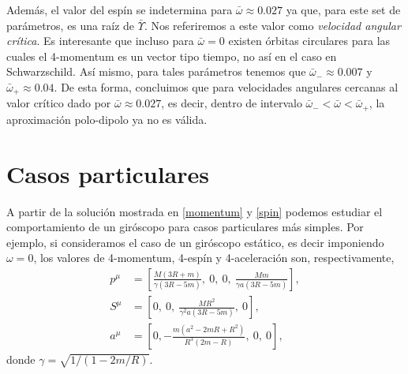 Además, el valor del espín se indetermina para $ \bar{\omega} \approx 0.027 $ ya que, para este set de parámetros, es una raíz de $\bar{\Upsilon}$. Nos referiremos a este valor como \textit{velocidad angular crítica}. Es interesante que incluso para $ \bar{\omega} = 0 $ existen órbitas circulares para las cuales el 4-momentum es un vector tipo tiempo, no así en el caso en Schwarzschild. Así mismo, para tales parámetros tenemos que $\bar{\omega}_- \approx 0.007$ y $\bar{\omega}_+ \approx 0.04$. De esta forma, concluimos que para velocidades angulares cercanas al valor crítico dado por $ \bar{\omega} \approx 0.027 $, es decir, dentro de intervalo $ \bar{\omega}_- < \bar{\omega} < \bar{\omega}_+$, la aproximación polo-dipolo ya no es válida.

\section{Casos particulares}

A partir de la solución mostrada en \eqref{momentum} y \eqref{spin} podemos estudiar el comportamiento de un giróscopo para casos particulares más simples. Por ejemplo, si consideramos el caso de un giróscopo estático, es decir imponiendo $\omega = 0$, los valores de 4-momentum, 4-espín y 4-aceleración son, respectivamente,
\begin{align}
p^{\mu} &= \left[ \frac{M \left(3 R + m\right)}{\gamma \left(3 R - 5 m\right)},\  0,\  0,\  \frac{M m}{\gamma a \left(3 R - 5 m\right)} \right],\\
S^{\mu} &= \left[ 0,\ 0,\ \frac{M R^{2}}{\gamma^{2} a \left(3 R - 5 m\right)},\ 0 \right],\\
a^{\mu} &= \left[ 0, -\frac{m \left(a^{2} - 2 m R + R^{2}\right)}{R^{3} \left(2 m - R\right)}, \ 0, \ 0  \right],
\end{align}
donde $\gamma = \sqrt{1/(1-2m/R)}$.

